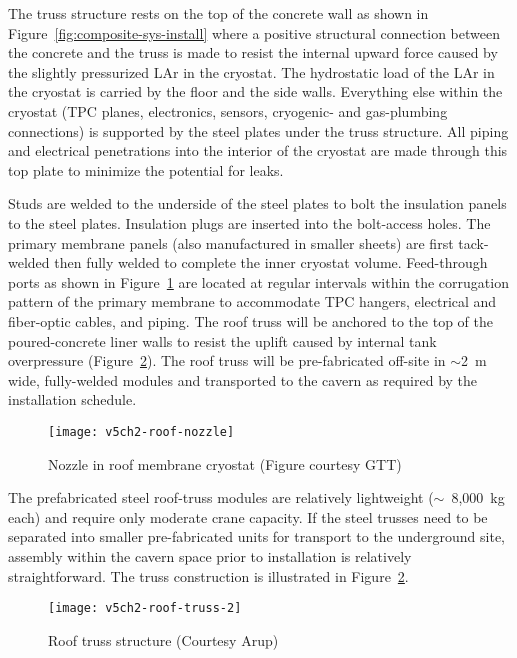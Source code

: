 The truss structure rests on the top of the concrete wall as shown in Figure~\ref{fig:composite-sys-install} where a positive structural connection between the concrete and the truss is made to resist the internal upward force caused  by the slightly pressurized LAr in the cryostat.
The hydrostatic load of the LAr in the cryostat is carried by the floor and the side walls.  Everything else within the cryostat (TPC planes, electronics, sensors,
cryogenic- and gas-plumbing connections) is supported by the steel plates under the truss structure. All piping and electrical penetrations into the interior of the cryostat are made through this top plate to minimize the potential for leaks.

Studs are welded to the underside of the steel plates to bolt the insulation panels to the steel plates.  Insulation plugs are inserted into the bolt-access holes.  The primary membrane panels (also manufactured in smaller sheets) are first tack-welded then fully welded to complete the inner cryostat volume.  Feed-through ports as shown in Figure~\ref{fig:v5ch2-roof-nozzle} are located at regular intervals within the corrugation pattern of the primary membrane to accommodate TPC hangers, electrical and fiber-optic cables, and piping.
The roof truss will be anchored to the top of the poured-concrete liner walls to resist the uplift caused by internal tank overpressure (Figure~\ref{fig:roof-truss}).  The roof truss will be pre-fabricated off-site in $\sim$2~m wide, 
fully-welded modules and transported to the cavern as required by the installation schedule.

\begin{figure}[htbp]
\centering
\texttt{[image: v5ch2-roof-nozzle]} 
\caption[Nozzle in roof membrane cryostat]{Nozzle in roof membrane cryostat (Figure courtesy GTT)}
\label{fig:v5ch2-roof-nozzle}
\end{figure}


 The prefabricated steel roof-truss modules are relatively lightweight ($\sim$~8,000~kg each) and require only moderate crane capacity.  If the steel trusses need to be separated into smaller pre-fabricated 
units for transport to the 
underground site, assembly within the cavern space prior to installation is 
relatively straightforward. The truss construction is illustrated in Figure~\ref{fig:roof-truss}.

\begin{figure}[htbp]
\centering
\texttt{[image: v5ch2-roof-truss-2]}
\caption[Roof truss structure]{Roof truss structure  (Courtesy Arup)}
\label{fig:roof-truss}
\end{figure}

